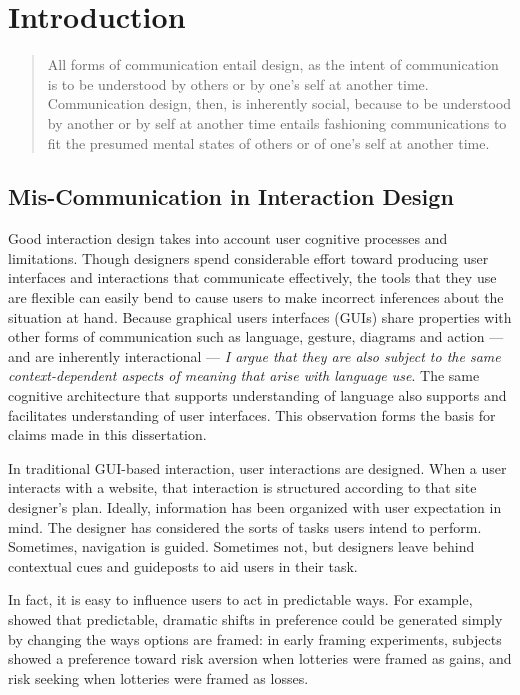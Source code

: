 \chapter{Introduction}
\label{introduction}

 \begin{quote} 

All forms of communication entail design, as the intent of communication is to be understood by others or by one's self at another time. Communication design, then, is inherently social, because to be understood by another or by self at another time entails fashioning communications to fit the presumed mental states of others or of one's self at another time.  \citep[p. 6]{Tversky:2010ww} 
 \end{quote} 

\section{Mis-Communication in Interaction Design}
\label{mis-communicationininteractiondesign}

Good interaction design takes into account user cognitive processes and limitations. Though designers spend considerable effort toward producing user interfaces and interactions that communicate effectively, the tools that they use are flexible can easily bend to cause users to make incorrect inferences about the situation at hand. Because graphical users interfaces (GUIs) share properties with other forms of communication such as language, gesture, diagrams and action --- and are inherently interactional --- \emph{I argue that they are also subject to the same context-dependent aspects of meaning that arise with language use}. The same cognitive architecture that supports understanding of language also supports and facilitates understanding of user interfaces. This observation forms the basis for claims made in this dissertation.

In traditional GUI-based interaction, user interactions are designed. When a user interacts with a website, that interaction is structured according to that site designer's plan. Ideally, information has been organized with user expectation in mind. The designer has considered the sorts of tasks users intend to perform. Sometimes, navigation is guided. Sometimes not, but designers leave behind contextual cues and guideposts to aid users in their task.

In fact, it is easy to influence users to act in predictable ways. For example,  \cite{Tversky:1981vc}  showed that predictable, dramatic shifts in preference could be generated simply by changing the ways options are framed: in early framing experiments, subjects showed a preference toward risk aversion when lotteries were framed as gains, and risk seeking when lotteries were framed as losses. 

